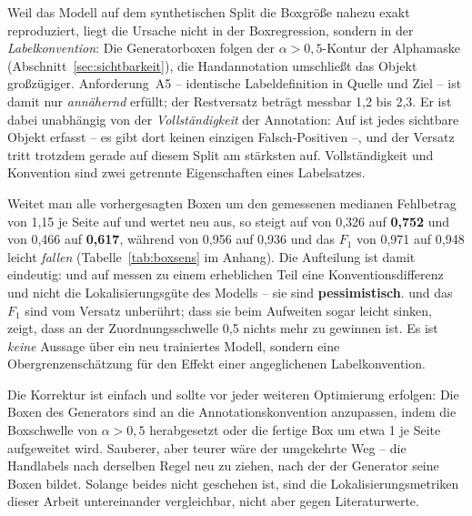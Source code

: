  Weil das Modell auf dem synthetischen
Split die Boxgröße nahezu exakt reproduziert, liegt die Ursache nicht in der
Boxregression, sondern in der \emph{Labelkonvention}: Die Generatorboxen folgen
der $\alpha > 0{,}5$-Kontur der Alphamaske
(Abschnitt~\ref{sec:sichtbarkeit}), die Handannotation umschließt das Objekt
großzügiger. Anforderung~A5 -- identische Labeldefinition in Quelle und Ziel --
ist damit nur \emph{annähernd} erfüllt; der Restversatz beträgt messbar 1,2 bis
2,3\px. Er ist dabei unabhängig von der \emph{Vollständigkeit} der Annotation:
Auf  ist jedes sichtbare Objekt erfasst -- es gibt dort keinen
einzigen Falsch-Positiven --, und der Versatz tritt trotzdem gerade auf diesem
Split am stärksten auf. Vollständigkeit und Konvention sind zwei getrennte
Eigenschaften eines Labelsatzes.

 Weitet man alle vorhergesagten Boxen um den
gemessenen medianen Fehlbetrag von 1,15\px{} je Seite auf und wertet neu aus, so
steigt \mAPseven{} auf  von 0,326 auf \textbf{0,752} und \mAPall{} von
0,466 auf \textbf{0,617}, während \mAPfifty{} von 0,956 auf 0,936 und das $F_1$
von 0,971 auf 0,948 leicht \emph{fallen} (Tabelle~\ref{tab:boxsens} im Anhang).
Die Aufteilung ist damit eindeutig: \mAPseven{} und \mAPall{} auf 
messen zu einem erheblichen Teil eine Konventionsdifferenz und nicht die
Lokalisierungsgüte des Modells -- sie sind \textbf{pessimistisch}. \mAPfifty{}
und das $F_1$ sind vom Versatz unberührt; dass sie beim Aufweiten sogar leicht
sinken, zeigt, dass an der Zuordnungsschwelle 0,5 nichts mehr zu gewinnen ist.
Es ist \emph{keine} Aussage über ein neu trainiertes Modell, sondern eine
Obergrenzenschätzung für den Effekt einer angeglichenen Labelkonvention.

 Die Korrektur ist einfach und sollte vor jeder weiteren
Optimierung erfolgen: Die Boxen des Generators sind an die Annotationskonvention
anzupassen, indem die Boxschwelle von $\alpha > 0{,}5$ herabgesetzt oder die
fertige Box um etwa 1\px{} je Seite aufgeweitet wird. Sauberer, aber teurer wäre
der umgekehrte Weg -- die Handlabels nach derselben Regel neu zu ziehen, nach der
der Generator seine Boxen bildet. Solange beides nicht geschehen ist, sind die
Lokalisierungsmetriken dieser Arbeit untereinander vergleichbar, nicht aber gegen
Literaturwerte.
